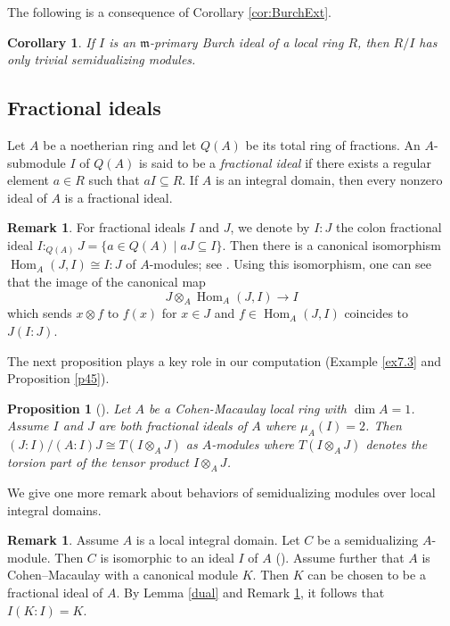 \documentclass{amsart}
\newcommand{\m}{\mathfrak{m}}
\DeclareMathOperator{\Hom}{Hom}
\theoremstyle{plain}
\newtheorem{prop}[theorem]{Proposition}
\newtheorem{cor}[theorem]{Corollary}
\theoremstyle{definition}
\newtheorem{remark}[theorem]{Remark}
\numberwithin{theorem}{section}
\numberwithin{equation}{section}
\numberwithin{equation}{theorem}
\begin{document}
The following is a consequence of Corollary \ref{cor:BurchExt}. 

\begin{cor} \label{burchsemi}
If $I$ is an $\m$-primary Burch ideal of a local ring $R$, then $R/I$ has only trivial semidualizing modules.
\end{cor}

\subsection{Fractional ideals}

Let $A$ be a noetherian ring and let $Q(A)$ be its total ring of fractions.
An $A$-submodule $I$ of $Q(A)$ is said to be a \emph{fractional ideal} if there exists a regular element $a\in R$ such that $aI \subseteq R$.
If $A$ is an integral domain, then every nonzero ideal of $A$ is a fractional ideal.

\begin{remark} \label{fraciso}
For fractional ideals $I$ and $J$, we denote by $I:J$ the colon fractional ideal $I:_{Q(A)}J=\{a\in Q(A)\mid aJ\subseteq I\}$.
Then there is a canonical isomorphism $\Hom_A(J,I) \cong I \colon J$ of $A$-modules; see \cite[Lemma 2.4.2]{HS}.
Using this isomorphism, one can see that the image of the canonical map
\[
J \otimes_A \Hom_A(J,I) \to I
\]
which sends $x\otimes f$ to $f(x)$ for $x\in J$ and $f\in \Hom_A(J,I)$ coincides to $J(I:J)$.
\end{remark}

The next proposition plays a key role in our computation (Example \ref{ex7.3} and Proposition \ref{p45}).

\begin{prop}[{\cite[Proposition 6.3]{GTTT}}] \label{prop6.3} Let $A$ be a Cohen-Macaulay local ring with $\dim A=1$. Assume $I$ and $J$ are both fractional ideals of $A$ where $\mu_A(I)=2$. Then $(J:I)/(A:I)J \cong T(I\otimes_A J)$ as $A$-modules where $T(I\otimes_A J)$ denotes the torsion part of the tensor product $I\otimes_A J$.
\end{prop}

We give one more remark about behaviors of semidualizing modules over local integral domains.

\begin{remark} \label{r214}
Assume $A$ is a local integral domain.
Let $C$ be a semidualizing $A$-module.
Then $C$ is isomorphic to an ideal $I$ of $A$ (\cite[Proposition 3.1]{SW07}).
Assume further that $A$ is Cohen--Macaulay with a canonical module $K$.
Then $K$ can be chosen to be a fractional ideal of $A$.
By Lemma \ref{dual} and Remark \ref{fraciso}, it follows that $I(K:I)=K$.
\end{remark}
\end{document}

